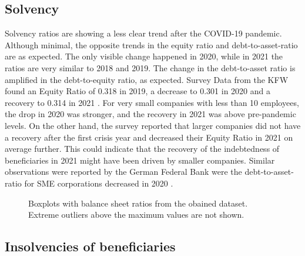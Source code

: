\subsection{Solvency}

Solvency ratios are showing a less clear trend after the COVID-19 pandemic. Although minimal, the opposite trends in the equity ratio and debt-to-asset-ratio are as expected. The only visible change happened in 2020, while in 2021 the ratios are very similar to 2018 and 2019. The change in the debt-to-asset ratio is amplified in the debt-to-equity ratio, as expected. Survey Data from the KFW found an Equity Ratio of 0.318 in 2019, a decrease to 0.301 in 2020 and a recovery to 0.314 in 2021 \parencite{kfw_kfw-mittelstandspanel_2022}. For very small companies with less than 10 employees, the drop in 2020 was stronger, and the recovery in 2021 was above pre-pandemic levels. On the other hand, the survey reported
that larger companies did not have a recovery after the first crisis year and decreased their Equity Ratio in 2021 on average further. 
This could indicate that the recovery of the indebtedness of beneficiaries in 2021 might have been driven by smaller companies. Similar observations were reported by the German Federal Bank were the debt-to-asset-ratio for SME corporations decreased in 2020 \parencite{deutsche_bundesbank_jahresabschlussstatistik_2022}.



\begin{figure}
\centering
{}%

\decoRule
\caption[Indicators of liquidity and solvency 2019-2021]{Boxplots with balance sheet ratios from the obained dataset. Extreme outliers above the maximum values are not shown.}
\label{fig:Ratios}
\end{figure}






\subsection{Insolvencies of beneficiaries}



